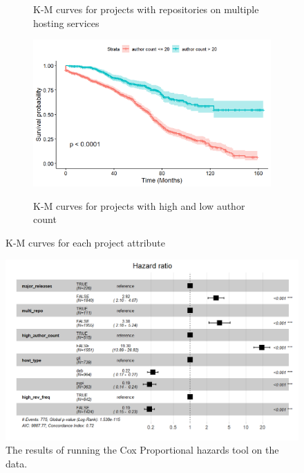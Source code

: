 \documentclass[acmconf]{acmart}
\begin{document}
\begin{figure}[!ht]
\begin{subfigure}[b]{0.45\textwidth}
        \label{fig:multi_repo}
        \caption{\small K-M curves for projects with repositories on multiple hosting services} 
    \end{subfigure}
    \hfill
    \begin{subfigure}[b]{0.45\textwidth} 
        \centering 
        \includegraphics[width=\textwidth]{img/KM-author_count.jpg} 
        \label{fig:author_count}
        \caption{\small K-M curves for projects with high and low author count} 
    \end{subfigure}
    \caption{\small K-M curves for each project attribute} 
    \label{fig:KM curves}
\end{figure}

\begin{figure}[!ht]
\centering
\includegraphics[scale=0.5]{img/CoxHR-table.jpg}
\caption{The results of running the Cox Proportional hazards tool on the data. }
\label{fig:Cox}
\end{figure}
\end{document}
